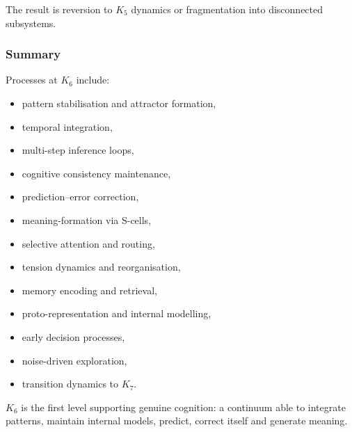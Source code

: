 The result is reversion to $K_5$ dynamics or fragmentation into
disconnected subsystems.

\subsubsection{Summary}

Processes at $K_6$ include:
\begin{itemize}
    \item pattern stabilisation and attractor formation,
    \item temporal integration,
    \item multi-step inference loops,
    \item cognitive consistency maintenance,
    \item prediction–error correction,
    \item meaning-formation via S-cells,
    \item selective attention and routing,
    \item tension dynamics and reorganisation,
    \item memory encoding and retrieval,
    \item proto-representation and internal modelling,
    \item early decision processes,
    \item noise-driven exploration,
    \item transition dynamics to $K_7$.
\end{itemize}

$K_6$ is the first level supporting genuine cognition:
a continuum able to integrate patterns, maintain internal models,
predict, correct itself and generate meaning.
